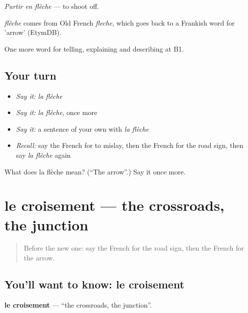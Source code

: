 \emph{Partir en flèche} — to shoot off.

\begin{cousinweb}
\emph{flèche} comes from Old French \emph{fleche}, which goes back to a Frankish word for 'arrow' (EtymDB).
\end{cousinweb}

\begin{grammarlens}[title={What you've built}]
One more word for telling, explaining and describing at B1.
\end{grammarlens}

\subsection*{Your turn}
\begin{itemize}
\raggedright
  \item \emph{Say it:} \emph{la flèche}
  \item \emph{Say it:} \emph{la flèche}, once more
  \item \emph{Say it:} a sentence of your own with \emph{la flèche}
  \item \emph{Recall:} say the French for to mislay, then the French for the road sign, then say \emph{la flèche} again
\end{itemize}

\begin{tcolorbox}[breakable,colback=teal!4,colframe=teal!35!black,title={Before you move on}]
What does la flèche mean? (\textquotedblleft{}The arrow\textquotedblright{}.) Say it once more.
\end{tcolorbox}
\section[le croisement]{le croisement — the crossroads, the junction}

\label{lesson:FR-C435-croisement}



\begin{quote}
Before the new one: say the French for the road sign, then the French for the arrow.
\end{quote}

\subsection*{You'll want to know: le croisement}
\textbf{le croisement} — \textquotedblleft{}the crossroads, the junction\textquotedblright{}.

